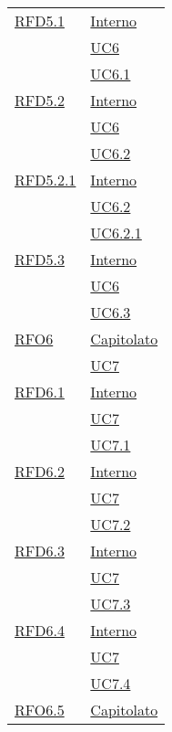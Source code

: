 \begin{longtable}{|>{\centering}m{5cm}|m{5cm}<{\centering}|}
\hyperlink{RFD5.1}{RFD5.1} & \hyperlink{Interno}{Interno}\\
& \hyperref[UC6]{UC6}\\
& \hyperref[UC6.1]{UC6.1}\\ \hline

\hyperlink{RFD5.2}{RFD5.2} & \hyperlink{Interno}{Interno}\\
& \hyperref[UC6]{UC6}\\
& \hyperref[UC6.2]{UC6.2}\\ \hline

\hyperlink{RFD5.2.1}{RFD5.2.1} & \hyperlink{Interno}{Interno}\\
& \hyperref[UC6.2]{UC6.2}\\
& \hyperref[UC6.2.1]{UC6.2.1}\\ \hline

\hyperlink{RFD5.3}{RFD5.3} & \hyperlink{Interno}{Interno}\\
& \hyperref[UC6]{UC6}\\
& \hyperref[UC6.3]{UC6.3}\\ \hline

\hyperlink{RFO6}{RFO6} & \hyperlink{Capitolato}{Capitolato}\\
& \hyperref[UC7]{UC7}\\ \hline

\hyperlink{RFD6.1}{RFD6.1} & \hyperlink{Interno}{Interno}\\
& \hyperref[UC7]{UC7}\\
& \hyperref[UC7.1]{UC7.1}\\ \hline

\hyperlink{RFD6.2}{RFD6.2} & \hyperlink{Interno}{Interno}\\
& \hyperref[UC7]{UC7}\\
& \hyperref[UC7.2]{UC7.2}\\ \hline

\hyperlink{RFD6.3}{RFD6.3} & \hyperlink{Interno}{Interno}\\
& \hyperref[UC7]{UC7}\\
& \hyperref[UC7.3]{UC7.3}\\ \hline

\hyperlink{RFD6.4}{RFD6.4} & \hyperlink{Interno}{Interno}\\
& \hyperref[UC7]{UC7}\\
& \hyperref[UC7.4]{UC7.4}\\ \hline

\hyperlink{RFO6.5}{RFO6.5} & \hyperlink{Capitolato}{Capitolato}\\ \hline


\end{longtable}
